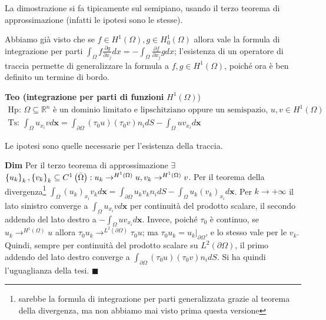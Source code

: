 \documentclass{article}
\begin{document}
La dimostrazione si fa tipicamente sul semipiano, usando il terzo teorema di
approssimazione (infatti le ipotesi sono le stesse).

Abbiamo gi\`{a} visto che se $f\in H^{1}\left( \Omega \right) ,g\in
H_{0}^{1}\left( \Omega \right) $ allora vale la formula di integrazione per
parti $\int_{\Omega }f\frac{\partial g}{\partial x_{j}}dx=-\int_{\Omega }%
\frac{\partial f}{\partial x_{j}}gdx$; l'esistenza di un operatore di
traccia permette di generalizzare la formula a $f,g\in H^{1}\left( \Omega
\right) $, poich\'{e} ora \`{e} ben definito un termine di bordo.

\textbf{Teo (integrazione per parti di funzioni }$H^{1}\left( \Omega \right) 
$)%
\begin{gather*}
\text{Hp: }\Omega \subseteq 
\mathbb{R}
^{n}\text{ \`{e} un dominio limitato e lipschitziano oppure un semispazio, }%
u,v\in H^{1}\left( \Omega \right) \\
\text{Ts: }\int_{\Omega }u_{x_{i}}vd\mathbf{x}=\int_{\partial \Omega }\left(
\tau _{0}u\right) \left( \tau _{0}v\right) n_{i}dS-\int_{\Omega }uv_{x_{i}}d%
\mathbf{x}
\end{gather*}

Le ipotesi sono quelle necessarie per l'esistenza della traccia.

\textbf{Dim} Per il terzo teorema di approssimazione $\exists $ $\left\{
u_{k}\right\} _{k},\left\{ v_{k}\right\} _{k}\subseteq C^{1}\left( \bar{%
\Omega}\right) :u_{k}\rightarrow ^{H^{1}\left( \Omega \right)
}u,v_{k}\rightarrow ^{H^{1}\left( \Omega \right) }v$. Per il teorema della
divergenza\footnote{%
sarebbe la formula di integrazione per parti generalizzata grazie al teorema
della divergenza, ma non abbiamo mai visto prima questa versione} $%
\int_{\Omega }\left( u_{k}\right) _{x_{i}}v_{k}d\mathbf{x}=\int_{\partial
\Omega }u_{k}v_{k}n_{i}dS-\int_{\Omega }u_{k}\left( v_{k}\right) _{x_{i}}d%
\mathbf{x}$. Per $k\rightarrow +\infty $ il lato sinistro converge a $%
\int_{\Omega }u_{x_{i}}vd\mathbf{x}$ per continuit\`{a} del prodotto
scalare, il secondo addendo del lato destro a $-\int_{\Omega }uv_{x_{i}}d%
\mathbf{x}$. Invece, poich\'{e} $\tau _{0}$ \`{e} continuo, se $%
u_{k}\rightarrow ^{H^{1}\left( \Omega \right) }u$ allora $\tau
_{0}u_{k}\rightarrow ^{L^{2}\left( \partial \Omega \right) }\tau _{0}u$; ma $%
\tau _{0}u_{k}=u_{k}|_{\partial \Omega }$, e lo stesso vale per le $v_{k}$.
Quindi, sempre per continuit\`{a} del prodotto scalare su $L^{2}\left(
\partial \Omega \right) $, il primo addendo del lato destro converge a $%
\int_{\partial \Omega }\left( \tau _{0}u\right) \left( \tau _{0}v\right)
n_{i}dS$. Si ha quindi l'uguaglianza della tesi. $\blacksquare $
\end{document}
